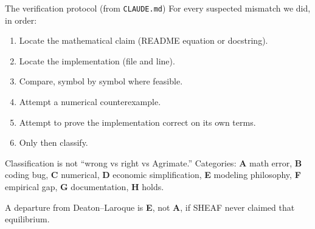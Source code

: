 \begin{frame}{The verification protocol (from \texttt{CLAUDE.md})}
For every suspected mismatch we did, in order:

\begin{enumerate}
\item Locate the mathematical claim (README equation or docstring).
\item Locate the implementation (file and line).
\item Compare, symbol by symbol where feasible.
\item Attempt a numerical counterexample.
\item Attempt to prove the implementation correct on its own terms.
\item Only then classify.
\end{enumerate}

Classification is not ``wrong vs right vs Agrimate.'' Categories:
\textbf{A} math error, \textbf{B} coding bug, \textbf{C} numerical,
\textbf{D} economic simplification, \textbf{E} modeling philosophy,
\textbf{F} empirical gap, \textbf{G} documentation, \textbf{H} holds.

A departure from Deaton--Laroque is \textbf{E}, not \textbf{A}, if SHEAF
never claimed that equilibrium.
\end{frame}

